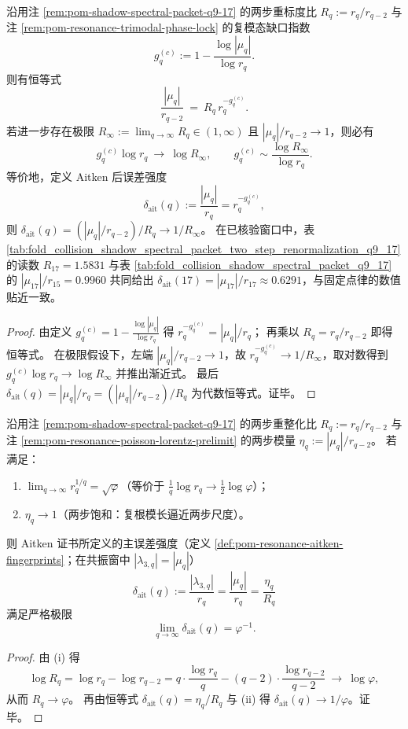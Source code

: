 \begin{proposition}\label{prop:pom-two-step-renorm-fixed-point-loglaw}
沿用注 \ref{rem:pom-shadow-spectral-packet-q9-17} 的两步重标度比 \(R_q:=r_q/r_{q-2}\) 与注 \ref{rem:pom-resonance-trimodal-phase-lock} 的复模态缺口指数
\[
g_q^{(c)}:=1-\frac{\log|\mu_q|}{\log r_q}.
\]
则有恒等式
\[
\frac{|\mu_q|}{r_{q-2}}\ =\ R_q\,r_q^{-g_q^{(c)}}.
\]
若进一步存在极限 \(R_\infty:=\lim_{q\to\infty}R_q\in(1,\infty)\) 且 \(|\mu_q|/r_{q-2}\to 1\)，则必有
\[
g_q^{(c)}\log r_q\ \longrightarrow\ \log R_\infty,
\qquad
g_q^{(c)}\sim \frac{\log R_\infty}{\log r_q}.
\]
等价地，定义 Aitken 后误差强度
\[
\delta_{\mathrm{ait}}(q):=\frac{|\mu_q|}{r_q}=r_q^{-g_q^{(c)}},
\]
则 \(\delta_{\mathrm{ait}}(q)=(|\mu_q|/r_{q-2})/R_q\to 1/R_\infty\)。
在已核验窗口中，表 \ref{tab:fold_collision_shadow_spectral_packet_two_step_renormalization_q9_17} 的读数 \(R_{17}=1.5831\) 与表 \ref{tab:fold_collision_shadow_spectral_packet_q9_17} 的 \(|\mu_{17}|/r_{15}=0.9960\) 共同给出
\(\delta_{\mathrm{ait}}(17)=|\mu_{17}|/r_{17}\approx 0.6291\)，与固定点律的数值贴近一致。
\end{proposition}
\begin{proof}%
由定义 \(g_q^{(c)}=1-\frac{\log|\mu_q|}{\log r_q}\) 得
\(
r_q^{-g_q^{(c)}}=|\mu_q|/r_q
\)；
再乘以 \(R_q=r_q/r_{q-2}\) 即得恒等式。
在极限假设下，左端 \(|\mu_q|/r_{q-2}\to 1\)，故 \(r_q^{-g_q^{(c)}}\to 1/R_\infty\)，取对数得到 \(g_q^{(c)}\log r_q\to \log R_\infty\) 并推出渐近式。
最后 \(\delta_{\mathrm{ait}}(q)=|\mu_q|/r_q=(|\mu_q|/r_{q-2})/R_q\) 为代数恒等式。证毕。
\end{proof}

\begin{corollary}\label{cor:pom-aitken-golden-limit}
沿用注 \ref{rem:pom-shadow-spectral-packet-q9-17} 的两步重整化比 \(R_q:=r_q/r_{q-2}\) 与注 \ref{rem:pom-resonance-poisson-lorentz-prelimit} 的两步模量
\(
\eta_q:=|\mu_q|/r_{q-2}
\)。
若满足：
\begin{enumerate}
  \item[(i)] \(\lim_{q\to\infty} r_q^{1/q}=\sqrt{\varphi}\)（等价于 \(\frac{1}{q}\log r_q\to \tfrac12\log\varphi\)）；
  \item[(ii)] \(\eta_q\to 1\)（两步饱和：复根模长逼近两步尺度）。
\end{enumerate}
则 Aitken 证书所定义的主误差强度（定义 \ref{def:pom-resonance-aitken-fingerprints}；在共振窗中 \(|\lambda_{3,q}|=|\mu_q|\)）
\[
\delta_{\mathrm{ait}}(q):=\frac{|\lambda_{3,q}|}{r_q}=\frac{|\mu_q|}{r_q}=\frac{\eta_q}{R_q}
\]
满足严格极限
\[
\lim_{q\to\infty}\delta_{\mathrm{ait}}(q)=\varphi^{-1}.
\]
\end{corollary}
\begin{proof}
由 (i) 得
\[
\log R_q=\log r_q-\log r_{q-2}
=q\cdot\frac{\log r_q}{q}-(q-2)\cdot\frac{\log r_{q-2}}{q-2}\ \longrightarrow\ \log\varphi,
\]
从而 \(R_q\to\varphi\)。
再由恒等式 \(\delta_{\mathrm{ait}}(q)=\eta_q/R_q\) 与 (ii) 得 \(\delta_{\mathrm{ait}}(q)\to 1/\varphi\)。证毕。
\end{proof}

